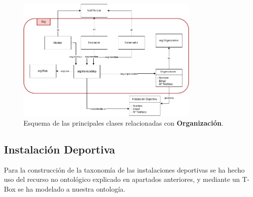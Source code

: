 \documentclass[a4paper,12pt]{article}
\begin{document}
	\begin{figure}[H]
		\centering
		\includegraphics[width=0.8\textwidth]{include/org.png}
		\caption{Esquema de las principales clases relacionadas con \textbf{Organización}.}
	\end{figure}
	
	\subsection{Instalación Deportiva}
	
	Para la construcción de la taxonomía de las instalaciones deportivas se ha hecho uso del recurso no ontológico explicado en apartados anteriores, y mediante un T-Box se ha modelado a nuestra ontología.
	
\end{document}
